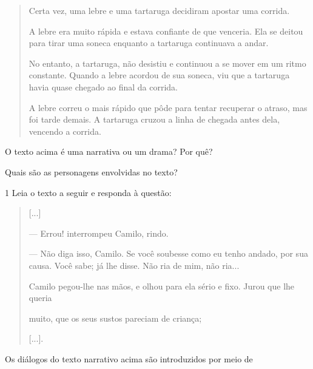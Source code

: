 \begin{quote}
Certa vez, uma lebre e uma tartaruga decidiram apostar uma corrida.

A lebre era muito rápida e estava confiante de que venceria. Ela se
deitou para tirar uma soneca enquanto a tartaruga continuava a andar.

No entanto, a tartaruga, não desistiu e continuou a se mover em um ritmo
constante. Quando a lebre acordou de sua soneca, viu que a tartaruga
havia quase chegado ao final da corrida.

A lebre correu o mais rápido que pôde para tentar recuperar o atraso,
mas foi tarde demais. A tartaruga cruzou a linha de chegada antes dela,
vencendo a corrida.
\end{quote}

\begin{escolha}
\item O texto acima é uma narrativa ou um drama? Por quê?



\item Quais são as personagens envolvidas no texto?

\end{escolha}



\num{1} Leia o texto a seguir e responda à questão:

\begin{quote}
{[}...{]}

--- Errou! interrompeu Camilo, rindo.

--- Não diga isso, Camilo. Se você soubesse como eu tenho andado, por
sua causa. Você sabe; já lhe disse. Não ria de mim, não ria...

Camilo pegou-lhe nas mãos, e olhou para ela sério e fixo. Jurou que lhe
queria

muito, que os seus sustos pareciam de criança;

{[}...{]}.

\end{quote}

Os diálogos do texto narrativo acima são introduzidos por meio de

